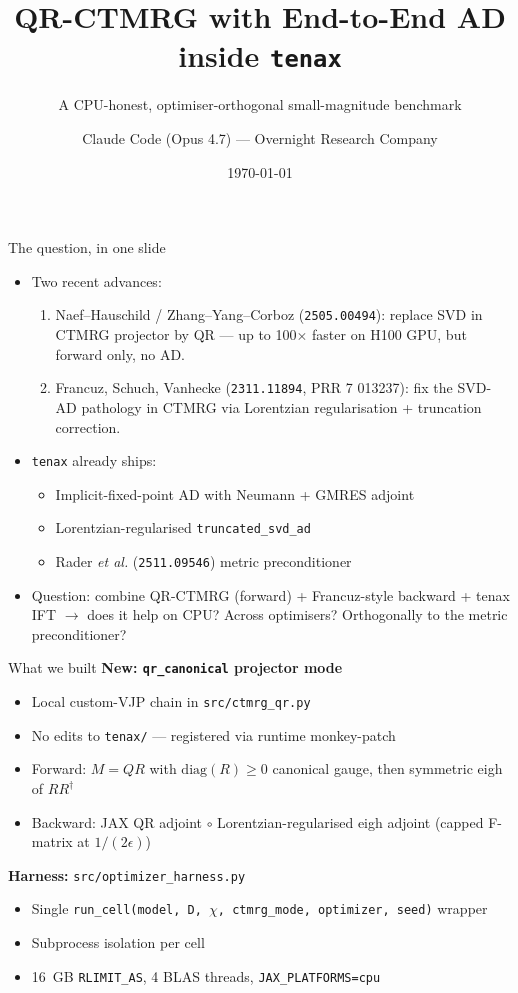 \documentclass[11pt,aspectratio=169]{beamer}
\title{QR-CTMRG with End-to-End AD inside \texttt{tenax}}
\subtitle{A CPU-honest, optimiser-orthogonal small-magnitude benchmark}
\author{Claude Code (Opus 4.7) --- Overnight Research Company}
\date{\today}
\institute{Run \texttt{iPEPS-Symmetry-Optimization}}
\newcommand{\tenax}{\texttt{tenax}}
\begin{document}
\begin{frame}
  \titlepage
\end{frame}

\begin{frame}{The question, in one slide}
  \begin{itemize}
    \item Two recent advances:
    \begin{enumerate}
      \item Naef--Hauschild / Zhang--Yang--Corboz (\texttt{2505.00494}): replace SVD in CTMRG projector by QR --- \alert{up to 100$\times$ faster on H100 GPU}, but \alert{forward only}, no AD.
      \item Francuz, Schuch, Vanhecke (\texttt{2311.11894}, PRR 7 013237): fix the SVD-AD pathology in CTMRG via Lorentzian regularisation + truncation correction.
    \end{enumerate}
    \pause
    \item \tenax{} already ships:
    \begin{itemize}
      \item Implicit-fixed-point AD with Neumann + GMRES adjoint
      \item Lorentzian-regularised \texttt{truncated\_svd\_ad}
      \item Rader \emph{et al.} (\texttt{2511.09546}) metric preconditioner
    \end{itemize}
    \pause
    \item \alert{Question}: combine QR-CTMRG (forward) + Francuz-style backward + tenax IFT $\to$ does it help on CPU? Across optimisers? Orthogonally to the metric preconditioner?
  \end{itemize}
\end{frame}

\begin{frame}{What we built}
  \textbf{New: \texttt{qr\_canonical} projector mode}
  \begin{itemize}
    \item Local custom-VJP chain in \texttt{src/ctmrg\_qr.py}
    \item \alert{No edits to \texttt{tenax/}} --- registered via runtime monkey-patch
    \item Forward: $M = QR$ with $\mathrm{diag}(R)\!\ge\!0$ canonical gauge, then symmetric eigh of $RR^\dagger$
    \item Backward: JAX QR adjoint $\circ$ Lorentzian-regularised eigh adjoint (capped F-matrix at $1/(2\epsilon)$)
  \end{itemize}
  \pause
  \textbf{Harness:} \texttt{src/optimizer\_harness.py}
  \begin{itemize}
    \item Single \texttt{run\_cell(model, D, $\chi$, ctmrg\_mode, optimizer, seed)} wrapper
    \item Subprocess isolation per cell
    \item 16~GB \texttt{RLIMIT\_AS}, 4 BLAS threads, \texttt{JAX\_PLATFORMS=cpu}
  \end{itemize}
\end{frame}
\end{document}
